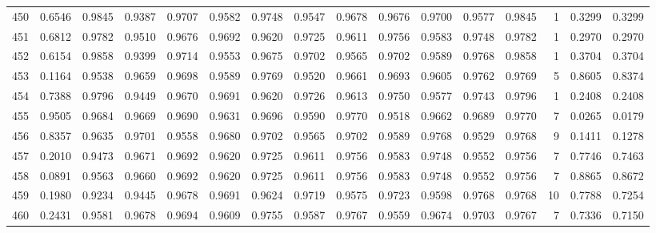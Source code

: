 \begin{tabular}{lrrrrrrrrrrrrrrr}
450 &      0.6546 &  0.9845 &  0.9387 &  0.9707 &  0.9582 &  0.9748 &  0.9547 &  0.9678 &  0.9676 &  0.9700 &   0.9577 &     0.9845 &      1 &                    0.3299 &                     0.3299 \\
451 &      0.6812 &  0.9782 &  0.9510 &  0.9676 &  0.9692 &  0.9620 &  0.9725 &  0.9611 &  0.9756 &  0.9583 &   0.9748 &     0.9782 &      1 &                    0.2970 &                     0.2970 \\
452 &      0.6154 &  0.9858 &  0.9399 &  0.9714 &  0.9553 &  0.9675 &  0.9702 &  0.9565 &  0.9702 &  0.9589 &   0.9768 &     0.9858 &      1 &                    0.3704 &                     0.3704 \\
453 &      0.1164 &  0.9538 &  0.9659 &  0.9698 &  0.9589 &  0.9769 &  0.9520 &  0.9661 &  0.9693 &  0.9605 &   0.9762 &     0.9769 &      5 &                    0.8605 &                     0.8374 \\
454 &      0.7388 &  0.9796 &  0.9449 &  0.9670 &  0.9691 &  0.9620 &  0.9726 &  0.9613 &  0.9750 &  0.9577 &   0.9743 &     0.9796 &      1 &                    0.2408 &                     0.2408 \\
455 &      0.9505 &  0.9684 &  0.9669 &  0.9690 &  0.9631 &  0.9696 &  0.9590 &  0.9770 &  0.9518 &  0.9662 &   0.9689 &     0.9770 &      7 &                    0.0265 &                     0.0179 \\
456 &      0.8357 &  0.9635 &  0.9701 &  0.9558 &  0.9680 &  0.9702 &  0.9565 &  0.9702 &  0.9589 &  0.9768 &   0.9529 &     0.9768 &      9 &                    0.1411 &                     0.1278 \\
457 &      0.2010 &  0.9473 &  0.9671 &  0.9692 &  0.9620 &  0.9725 &  0.9611 &  0.9756 &  0.9583 &  0.9748 &   0.9552 &     0.9756 &      7 &                    0.7746 &                     0.7463 \\
458 &      0.0891 &  0.9563 &  0.9660 &  0.9692 &  0.9620 &  0.9725 &  0.9611 &  0.9756 &  0.9583 &  0.9748 &   0.9552 &     0.9756 &      7 &                    0.8865 &                     0.8672 \\
459 &      0.1980 &  0.9234 &  0.9445 &  0.9678 &  0.9691 &  0.9624 &  0.9719 &  0.9575 &  0.9723 &  0.9598 &   0.9768 &     0.9768 &     10 &                    0.7788 &                     0.7254 \\
460 &      0.2431 &  0.9581 &  0.9678 &  0.9694 &  0.9609 &  0.9755 &  0.9587 &  0.9767 &  0.9559 &  0.9674 &   0.9703 &     0.9767 &      7 &                    0.7336 &                     0.7150 \\

\end{tabular}
